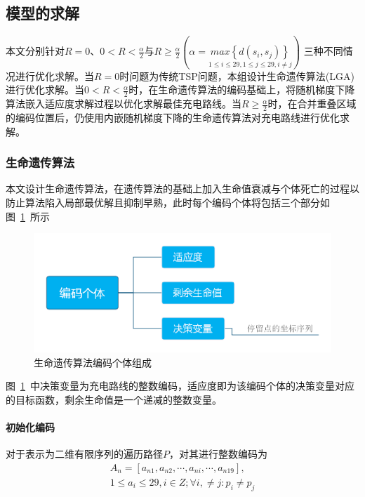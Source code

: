 \documentclass{whutmod}
\begin{document}
		\subsection{模型的求解}
		本文分别针对$R=0$、$0<R<\frac{\alpha }{2}$与$R\geqslant\frac{\alpha }{2} (\alpha =\underset{1\leqslant i\leqslant 29,1\leqslant j\leqslant 29,i\neq j}{max\left \{ d(s_i,s_j) \right \}}) $
		三种不同情况进行优化求解。当$R=0$时问题为传统TSP问题，本组设计生命遗传算法(LGA)进行优化求解。当$0<R<\frac{\alpha }{2}$时，在生命遗传算法的编码基础上，将随机梯度下降算法嵌入适应度求解过程以优化求解最佳充电路线。当$R\geqslant\frac{\alpha }{2}$时，在合并重叠区域的编码位置后，仍使用内嵌随机梯度下降的生命遗传算法对充电路线进行优化求解。
		
		\subsubsection{生命遗传算法}
		本文设计生命遗传算法，在遗传算法的基础上加入生命值衰减与个体死亡的过程以防止算法陷入局部最优解且抑制早熟，此时每个编码个体将包括三个部分如图~\ref{saf}~所示
		\begin{figure}[H]
			\centering
			\includegraphics[width=\textwidth]{figures/lga.png}
			\caption{生命遗传算法编码个体组成}\label{saf}
		\end{figure}
		
		图~\ref{saf}~中决策变量为充电路线的整数编码，适应度即为该编码个体的决策变量对应的目标函数，剩余生命值是一个递减的整数变量。
		 \paragraph{初始化编码}
		对于表示为二维有限序列的遍历路径$P$，对其进行整数编码为
		\begin{gather*}
		A_n=[a_{n1},a_{n2},\cdots,a_{ni},\cdots,a_{n19}], \\
		1\leqslant a_i \leqslant 29 ,i\in Z ;\forall i, \neq j:p_i \neq p_j 
		\end{gather*}
		
\end{document}
